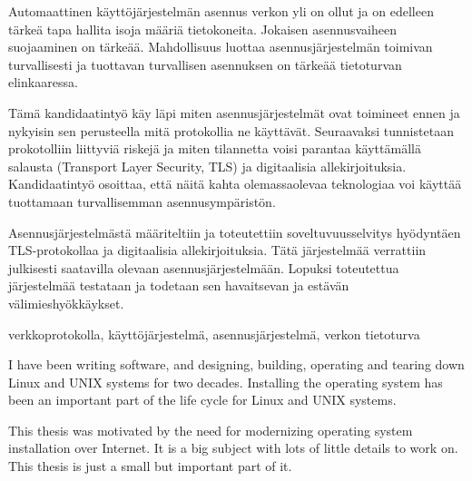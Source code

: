 \documentclass[a4paper,12pt,titlepage]{dithesis}
\begin{document}
\begin{tiivistelma}

Automaattinen käyttöjärjestelmän asennus verkon yli on ollut ja on
edelleen tärkeä tapa hallita isoja määriä tietokoneita. Jokaisen
asennusvaiheen suojaaminen on tärkeää. Mahdollisuus luottaa
asennusjärjestelmän toimivan turvallisesti ja tuottavan turvallisen
asennuksen on tärkeää tietoturvan elinkaaressa.

Tämä kandidaatintyö käy läpi miten asennusjärjestelmät ovat toimineet
ennen ja nykyisin sen perusteella mitä protokollia ne
käyttävät. Seuraavaksi tunnistetaan prokotolliin liittyviä riskejä ja
miten tilannetta voisi parantaa käyttämällä salausta (Transport Layer
Security, TLS) ja digitaalisia allekirjoituksia. Kandidaatintyö
osoittaa, että näitä kahta olemassaolevaa teknologiaa voi käyttää
tuottamaan turvallisemman asennusympäristön.

Asennusjärjestelmästä määriteltiin ja toteutettiin soveltuvuusselvitys
hyödyntäen TLS-protokollaa ja digitaalisia allekirjoituksia. Tätä
järjestelmää verrattiin julkisesti saatavilla olevaan
asennusjärjestelmään. Lopuksi toteutettua järjestelmää testataan ja
todetaan sen havaitsevan ja estävän välimieshyökkäykset.

\avainsanat verkkoprotokolla, käyttöjärjestelmä, asennusjärjestelmä, verkon tietoturva
\end{tiivistelma}


\sisluettelo

I have been writing software, and designing, building, operating and
tearing down Linux and UNIX systems for two decades. Installing the
operating system has been an important part of the life cycle for
Linux and UNIX systems.

This thesis was motivated by the need for modernizing operating system
installation over Internet. It is a big subject with lots of little
details to work on. This thesis is just a small but important part of
it.
\end{document}
